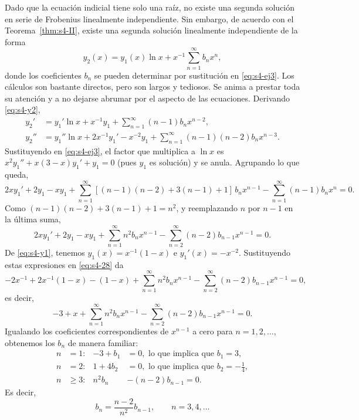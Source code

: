 \begin{example}
Dado que la ecuación indicial tiene solo una raíz, no existe una segunda solución en serie de Frobenius linealmente independiente. Sin embargo, de acuerdo con el Teorema~\ref{thm:s4-II}, existe una segunda solución linealmente independiente de la forma
\begin{equation}
y_2(x) = y_1(x) \ln x + x^{-1} \sum_{n=1}^{\infty} b_n x^n,
\label{eq:s4-y2}
\end{equation}
donde los coeficientes $b_n$ se pueden determinar por sustitución en \eqref{eq:s4-ej3}. Los cálculos son bastante directos, pero son largos y tediosos. Se anima a prestar toda su atención y a no dejarse abrumar por el aspecto de las ecuaciones. Derivando \eqref{eq:s4-y2},
\begin{align*}
y_2' &= y_1' \ln x + x^{-1} y_1 + \sum_{n=1}^{\infty} (n - 1)b_n x^{n-2}, \\
y_2'' &= y_1'' \ln x + 2x^{-1}y_1' - x^{-2}y_1 + \sum_{n=1}^{\infty} (n - 1)(n-2)b_n x^{n-3}.
\end{align*}
Sustituyendo en \eqref{eq:s4-ej3}, el factor que multiplica a $\ln x$ es $x^2y_1''+x(3-x)y_1'+y_1=0$ (pues $y_1$ es solución) y se anula. Agrupando lo que queda,
\[ 2xy_1' + 2y_1 - xy_1 + \sum_{n=1}^{\infty} [(n-1)(n-2)+3(n-1)+1]\,b_n x^{n-1} - \sum_{n=1}^{\infty} (n - 1)b_n x^n = 0 . \]
Como $(n-1)(n-2)+3(n-1)+1=n^2$, y reemplazando $n$ por $n-1$ en la última suma,
\begin{equation}
2xy_1' + 2y_1 - xy_1 + \sum_{n=1}^{\infty} n^2 b_n x^{n-1} - \sum_{n=2}^{\infty} (n - 2)b_{n-1}x^{n-1} = 0.
\label{eq:s4-28}
\end{equation}
De \eqref{eq:s4-y1}, tenemos $y_1(x) = x^{-1}(1 - x)$ e $y_1'(x) = -x^{-2}$. Sustituyendo estas expresiones en \eqref{eq:s4-28} da
\[ -2x^{-1} + 2x^{-1}(1 - x) - (1 - x) + \sum_{n=1}^{\infty} n^2 b_n x^{n-1} - \sum_{n=2}^{\infty} (n - 2)b_{n-1}x^{n-1} = 0, \]
es decir,
\[ -3 + x + \sum_{n=1}^{\infty} n^2 b_n x^{n-1} - \sum_{n=2}^{\infty} (n - 2)b_{n-1}x^{n-1} = 0. \]
Igualando los coeficientes correspondientes de $x^{n-1}$ a cero para $n = 1, 2, \dots$, obtenemos los $b_n$ de manera familiar:
\begin{align*}
n &= 1: & -3 + b_1 &= 0, \text{ lo que implica que } b_1 = 3, \\
n &= 2: & 1 + 4b_2 &= 0, \text{ lo que implica que } b_2 = -\frac{1}{4}, \\
n &\ge 3: & n^2 b_n &- (n - 2)b_{n-1} = 0.
\end{align*}
Es decir,
\begin{equation}
b_n = \frac{n - 2}{n^2}b_{n-1}, \qquad n = 3, 4, \dots

\end{equation}
\end{example}
